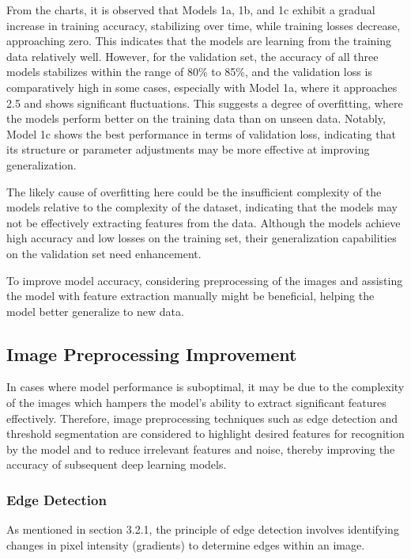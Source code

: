 From the charts, it is observed that Models 1a, 1b, and 1c exhibit a gradual increase in training accuracy, stabilizing over time, while training losses decrease, approaching zero. This indicates that the models are learning from the training data relatively well. However, for the validation set, the accuracy of all three models stabilizes within the range of 80\% to 85\%, and the validation loss is comparatively high in some cases, especially with Model 1a, where it approaches 2.5 and shows significant fluctuations. This suggests a degree of overfitting, where the models perform better on the training data than on unseen data. Notably, Model 1c shows the best performance in terms of validation loss, indicating that its structure or parameter adjustments may be more effective at improving generalization.

The likely cause of overfitting here could be the insufficient complexity of the models relative to the complexity of the dataset, indicating that the models may not be effectively extracting features from the data. Although the models achieve high accuracy and low losses on the training set, their generalization capabilities on the validation set need enhancement.

To improve model accuracy, considering preprocessing of the images and assisting the model with feature extraction manually might be beneficial, helping the model better generalize to new data.

\subsection{Image Preprocessing Improvement}

In cases where model performance is suboptimal, it may be due to the complexity of the images which hampers the model's ability to extract significant features effectively. Therefore, image preprocessing techniques such as edge detection and threshold segmentation are considered to highlight desired features for recognition by the model and to reduce irrelevant features and noise, thereby improving the accuracy of subsequent deep learning models.


\subsubsection{Edge Detection}

As mentioned in section 3.2.1, the principle of edge detection involves identifying changes in pixel intensity (gradients) to determine edges within an image. 

